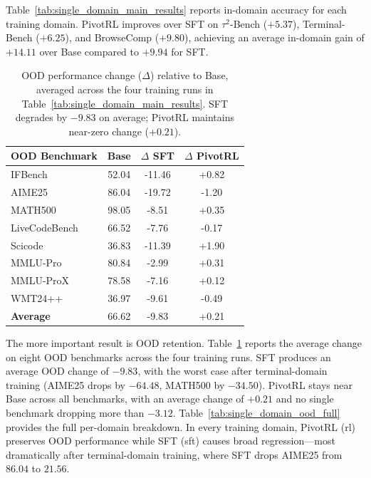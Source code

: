 Table~\ref{tab:single_domain_main_results} reports in-domain accuracy for each training domain. PivotRL improves over SFT on $\tau^2$-Bench ($+5.37$), Terminal-Bench ($+6.25$), and BrowseComp ($+9.80$), achieving an average in-domain gain of $+14.11$ over Base compared to $+9.94$ for SFT.
\begin{table}[t]
\centering
\small
\begin{tabular}{l c cc}
\toprule
\textbf{OOD Benchmark} & \textbf{Base} & \textbf{$\Delta$ SFT} & \textbf{$\Delta$ PivotRL} \\
\midrule
IFBench        & 52.04 & -11.46 & +0.82 \\
AIME25         & 86.04 & -19.72 & -1.20 \\
MATH500        & 98.05 & -8.51  & +0.35 \\
LiveCodeBench  & 66.52 & -7.76  & -0.17 \\
Scicode        & 36.83 & -11.39  & +1.90 \\
MMLU-Pro       & 80.84 & -2.99  & +0.31 \\
MMLU-ProX      & 78.58 & -7.16  & +0.12 \\
WMT24++        & 36.97 & -9.61  & -0.49 \\
\midrule
\textbf{Average} & 66.62 & -9.83 & +0.21 \\
\bottomrule
\end{tabular}
\caption{
OOD performance change ($\Delta$) relative to Base, averaged across the four training runs in Table~\ref{tab:single_domain_main_results}. SFT degrades by $-9.83$ on average; PivotRL maintains near-zero change ($+0.21$).
}
\label{tab:single_domain_ood_avg}
\end{table}
The more important result is OOD retention. Table~\ref{tab:single_domain_ood_avg} reports the average change on eight OOD benchmarks across the four training runs. SFT produces an average OOD change of $-9.83$, with the worst case after terminal-domain training (AIME25 drops by $-64.48$, MATH500 by $-34.50$). PivotRL stays near Base across all benchmarks, with an average change of $+0.21$ and no single benchmark dropping more than $-3.12$.
Table~\ref{tab:single_domain_ood_full} provides the full per-domain breakdown. In every training domain, PivotRL (rl) preserves OOD performance while SFT (sft) causes broad regression---most dramatically after terminal-domain training, where SFT drops AIME25 from $86.04$ to $21.56$.


